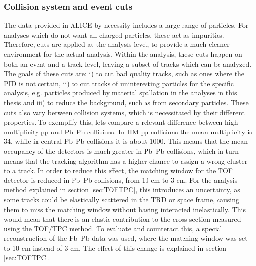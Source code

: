 \subsubsection{Collision system and event cuts}
The data provided in ALICE by necessity includes a large range of particles. For analyses which do not want all charged particles, these act as impurities. Therefore, cuts are applied at the analysis level, to provide a much cleaner environment for the actual analysis. Within the analysis, these cuts happen on both an event and a track level, leaving a subset of tracks which can be analyzed. The goals of these cuts are: i) to cut bad quality tracks, such as ones where the PID is not certain, ii) to cut tracks of uninteresting particles for the specific analysis, e.g. particles produced by material spallation in the analyses in this thesis and iii) to reduce the background, such as from secondary particles. These cuts also vary between collision systems, which is necessitated by their different properties. To exemplify this, lets compare a relevant difference between high multiplicity pp and Pb--Pb collisions. In HM pp collisions the mean multiplicity is 34, while in central Pb--Pb collisions it is about 1000. This means that the mean occupancy of the detectors is much greater in Pb--Pb collisions, which in turn means that the tracking algorithm has a higher chance to assign a wrong cluster to a track. In order to reduce this effect, the matching window for the TOF detector is reduced in Pb--Pb collisions, from 10 cm to 3 cm. For the analysis method explained in section \ref{sec:TOFTPC}, this introduces an uncertainty, as some tracks could be elastically scattered in the TRD or space frame, causing them to miss the matching window without having interacted inelastically. This would mean that there is an elastic contribution to the cross section measured using the TOF/TPC method. To evaluate and counteract this, a special reconstruction of the Pb--Pb data was used, where the matching window was set to 10 cm instead of 3 cm. The effect of this change is explained in section \ref{sec:TOFTPC}. \\

